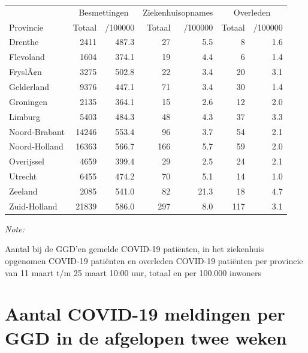 \documentclass[
  english,
  man,floatsintext]{apa6}
\begin{document}
\begin{table}
\centering
\begin{threeparttable}
\begin{tabular}{lrrrrrr}
\toprule
\multicolumn{1}{c}{ } & \multicolumn{2}{c}{Besmettingen} & \multicolumn{2}{c}{Ziekenhuisopnames} & \multicolumn{2}{c}{Overleden} \\
\cmidrule(l{3pt}r{3pt}){2-3} \cmidrule(l{3pt}r{3pt}){4-5} \cmidrule(l{3pt}r{3pt}){6-7}
Provincie & Totaal & /100000 & Totaal & /100000 & Totaal & /100000\\
\midrule
Drenthe & 2411 & 487.3 & 27 & 5.5 & 8 & 1.6\\
Flevoland & 1604 & 374.1 & 19 & 4.4 & 6 & 1.4\\
FryslÃ¢n & 3275 & 502.8 & 22 & 3.4 & 20 & 3.1\\
Gelderland & 9376 & 447.1 & 71 & 3.4 & 30 & 1.4\\
Groningen & 2135 & 364.1 & 15 & 2.6 & 12 & 2.0\\
Limburg & 5403 & 484.3 & 48 & 4.3 & 37 & 3.3\\
Noord-Brabant & 14246 & 553.4 & 96 & 3.7 & 54 & 2.1\\
Noord-Holland & 16363 & 566.7 & 166 & 5.7 & 59 & 2.0\\
Overijssel & 4659 & 399.4 & 29 & 2.5 & 24 & 2.1\\
Utrecht & 6455 & 474.2 & 70 & 5.1 & 14 & 1.0\\
Zeeland & 2085 & 541.0 & 82 & 21.3 & 18 & 4.7\\
Zuid-Holland & 21839 & 586.0 & 297 & 8.0 & 117 & 3.1\\
\bottomrule
\end{tabular}
\begin{tablenotes}
\item \textit{Note: } 
\item Aantal bij de GGD’en gemelde COVID-19 patiënten, in het ziekenhuis opgenomen COVID-19 patiënten en overleden COVID-19 patiënten per provincie van 11 maart t/m 25 maart 10:00 uur, totaal en per 100.000 inwoners
\end{tablenotes}
\end{threeparttable}
\end{table}

\newpage

\hypertarget{aantal-covid-19-meldingen-per-ggd-in-de-afgelopen-twee-weken}{%
\section{Aantal COVID-19 meldingen per GGD in de afgelopen twee weken}\label{aantal-covid-19-meldingen-per-ggd-in-de-afgelopen-twee-weken}}
\end{document}
